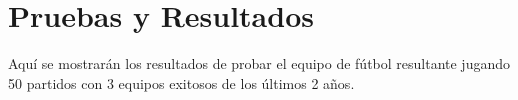 \chapter{Pruebas y Resultados}

Aquí se mostrarán los resultados de probar el equipo de fútbol resultante jugando 50 partidos con 3 equipos exitosos de los últimos 2 años.